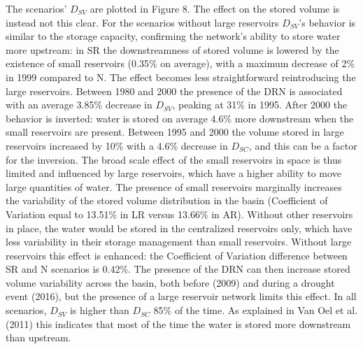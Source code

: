 \documentclass[draft]{agujournal2019}
\begin{document}
The scenarios’ $D_{SV}$ are plotted in Figure 8. The effect on the stored volume is instead not this clear. For the scenarios without large reservoirs $D_{SV}$’s behavior is similar to the storage capacity, confirming the network’s ability to store water more upstream: in SR the downstreamness of stored volume is lowered by the existence of small reservoirs (0.35\% on average), with a maximum decrease of 2\% in 1999 compared to N. The effect becomes less straightforward reintroducing the large reservoirs. Between 1980 and 2000 the presence of the DRN is associated with an average 3.85\% decrease in $D_{SV}$, peaking at 31\% in 1995. After 2000 the behavior is inverted: water is stored on average 4.6\% more downstream when the small reservoirs are present. Between 1995 and 2000 the volume stored in large reservoirs increased by 10\% with a 4.6\% decrease in $D_{SC}$, and this can be a factor for the inversion. The broad scale effect of the small reservoirs in space is thus limited and influenced by large reservoirs, which have a higher ability to move large quantities of water. The presence of small reservoirs marginally increases the variability of the stored volume distribution in the basin (Coefficient of Variation equal to 13.51\% in LR versus 13.66\% in AR). Without other reservoirs in place, the water would be stored in the centralized reservoirs only, which have less variability in their storage management than small reservoirs. Without large reservoirs this effect is enhanced: the Coefficient of Variation difference between SR and N scenarios is 0.42\%. The presence of the DRN can then increase stored volume variability across the basin, both before (2009) and during a drought event (2016), but the presence of a large reservoir network limits this effect. In all scenarios, $D_{SV}$ is higher than $D_{SC}$ 85\% of the time. As explained in Van Oel et al. (2011) this indicates that most of the time the water is stored more downstream than upstream.
\end{document}
